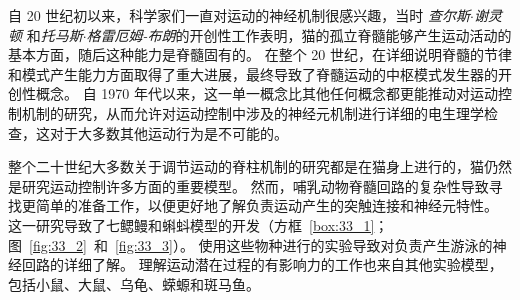 自 20 世纪初以来，科学家们一直对运动的神经机制很感兴趣，当时 \textit{查尔斯$\cdot$谢灵顿} 和\textit{托马斯$\cdot$格雷厄姆-布朗}的开创性工作表明，猫的孤立脊髓能够产生运动活动的基本方面，随后这种能力是脊髓固有的。
在整个 20 世纪，在详细说明脊髓的节律和模式产生能力方面取得了重大进展，最终导致了脊髓运动的中枢模式发生器的开创性概念。
自 1970 年代以来，这一单一概念比其他任何概念都更能推动对运动控制机制的研究，从而允许对运动控制中涉及的神经元机制进行详细的电生理学检查，这对于大多数其他运动行为是不可能的。


整个二十世纪大多数关于调节运动的脊柱机制的研究都是在猫身上进行的，猫仍然是研究运动控制许多方面的重要模型。
然而，哺乳动物脊髓回路的复杂性导致寻找更简单的准备工作，以便更好地了解负责运动产生的突触连接和神经元特性。
这一研究导致了七鳃鳗和蝌蚪模型的开发（方框~\ref{box:33_1}；图~\ref{fig:33_2}~和~\ref{fig:33_3}）。
使用这些物种进行的实验导致对负责产生游泳的神经回路的详细了解。
理解运动潜在过程的有影响力的工作也来自其他实验模型，包括小鼠、大鼠、乌龟、蝾螈和斑马鱼。



